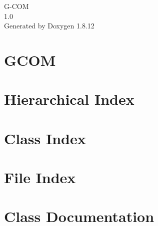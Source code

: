 \documentclass[twoside]{book}
\newcommand{\+}{\discretionary{\mbox{\scriptsize$\hookleftarrow$}}{}{}}
\newcommand{\clearemptydoublepage}{%
  \newpage{\pagestyle{empty}\cleardoublepage}%
}
\begin{document}
\hypersetup{pageanchor=false,
             bookmarksnumbered=true,
             pdfencoding=unicode
            }
\begin{titlepage}
\vspace*{7cm}
\begin{center}%
{\Large G-\/\+C\+OM \\[1ex]\large 1.\+0 }\\
\vspace*{1cm}
{\large Generated by Doxygen 1.8.12}\\
\end{center}
\end{titlepage}
\clearemptydoublepage
{}
\tableofcontents
\clearemptydoublepage
{}
\hypersetup{pageanchor=true}

\chapter{G\+C\+OM}
\label{md__r_e_a_d_m_e}
\hypertarget{md__r_e_a_d_m_e}{}

\chapter{Hierarchical Index}

\chapter{Class Index}

\chapter{File Index}

\chapter{Class Documentation}











\end{document}
